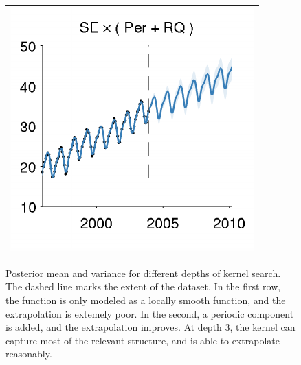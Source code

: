 \documentclass[twoside]{article}
\begin{document}
\begin{figure}
\begin{tabular}{c}
\hspace{-0.7cm} \includegraphics[width=\wmg,height=\hmg]{../figures/decomposition/11-Feb-v4-03-mauna2003-s_max_level_2/03-mauna2003-s_all_small}
\end{tabular}
\caption{Posterior mean and variance for different depths of kernel search.  The dashed line marks the extent of the dataset.  In the first row, the function is only modeled as a locally smooth function, and the extrapolation is extemely poor.  In the second, a periodic component is added, and the extrapolation improves.  At depth 3, the kernel can capture most of the relevant structure, and is able to extrapolate reasonably. %
}
\label{fig:mauna_grow}
\end{figure}
\end{document}
